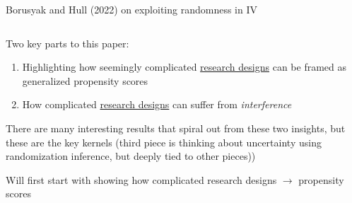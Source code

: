 \documentclass[notes,11pt, aspectratio=169]{beamer}
\newenvironment{wideitemize}{\itemize\addtolength{\itemsep}{10pt}}{\enditemize}
\begin{document}
\begin{frame}{Borusyak and Hull (2022) on exploiting randomness in IV}
\begin{columns}[T] %
\begin{column}{.6\textwidth}
  \begin{wideitemize}
  \item Two key parts to this paper:
    \begin{enumerate}
    \item Highlighting how seemingly complicated \underline{research designs} can be framed as generalized propensity scores
    \item How complicated \underline{research designs} can suffer from \emph{interference} 
    \end{enumerate}
  \item There are many interesting results that spiral out from these
    two insights, but these are the key kernels (third piece is
    thinking about uncertainty using randomization inference, but deeply
    tied to other pieces))
  \item Will first start with showing how complicated research designs $\rightarrow$ propensity scores
  \end{wideitemize}
\end{column}%
\hfill%
\begin{column}{.38\textwidth}
\end{column}%
\end{columns}
\end{frame}
\end{document}
